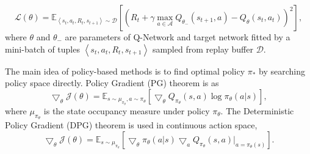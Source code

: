 \documentclass[acmsmall]{acmart}
\begin{document}
\begin{equation}
    \mathcal{L}\left(\theta\right) = \mathbb E_{\left<s_t,a_t,R_t,s_{t+1}\right>\sim \mathcal D}\left[\left(R_t+\gamma \mathop{max}\limits_{a\in \mathcal{A}}Q_{\theta_{-}}\left(s_{t+1},a\right)-Q_{\theta}\left(s_t, a_t\right)\right)^2\right],
\end{equation}
where $\theta$ and $\theta_-$ are parameters of Q-Network and target network fitted by a mini-batch of tuples $\left<s_t,a_t,R_t,s_{t+1}\right>$ sampled from replay buffer $\mathcal D$. 

The main idea of policy-based methods is to find optimal policy $\pi_*$ by searching policy space directly. Policy Gradient (PG) theorem \cite{sutton2018reinforcement} is as 
\begin{equation}
    \bigtriangledown_\theta \mathcal J\left(\theta\right)= \mathbb E_{s\sim \mu_{\pi_{\theta}}, a \sim \pi_\theta} \left[\bigtriangledown_\theta Q_{\pi_\theta}\left(s,a\right) \mathop{log} \pi_\theta \left(a|s\right)\right],
\end{equation}
where $\mu_{\pi_\theta}$ is the state occupancy measure under policy $\pi_\theta$. The Deterministic Policy Gradient (DPG) theorem is used in continuous action space, 
\begin{equation}
    \bigtriangledown_\theta \mathcal J\left(\theta\right) = \mathbb E_{s\sim \mu_{\pi_{\theta}}} \left[\bigtriangledown_\theta \pi_\theta \left(a|s\right) \bigtriangledown_a Q_{\pi_\theta}\left(s,a\right)|_{a=\pi_\theta \left(s\right)}\right].
\end{equation}
\end{document}
